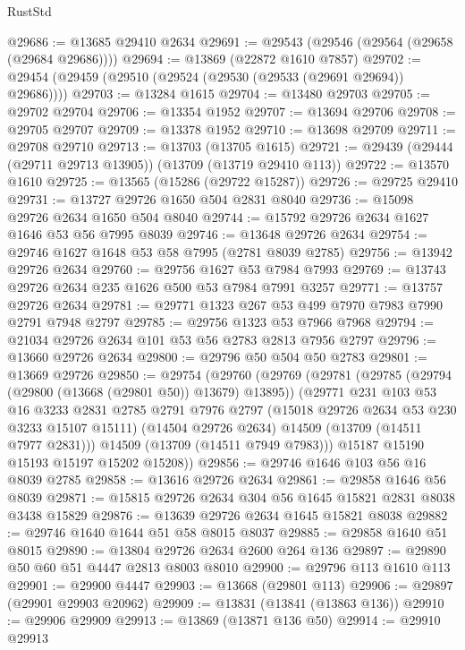 \begin{lexlean}{RustStd}
\begin{coremodule}
@29686 := @13685 @29410 @2634
@29691 := @29543 (@29546 (@29564 (@29658 (@29684 @29686))))
@29694 := @13869 (@22872 @1610 @7857)
@29702 := @29454 (@29459 (@29510 (@29524 (@29530 (@29533 (@29691 @29694)) @29686))))
@29703 := @13284 @1615
@29704 := @13480 @29703
@29705 := @29702 @29704
@29706 := @13354 @1952
@29707 := @13694 @29706
@29708 := @29705 @29707
@29709 := @13378 @1952
@29710 := @13698 @29709
@29711 := @29708 @29710
@29713 := @13703 (@13705 @1615)
@29721 := @29439 (@29444 (@29711 @29713 @13905)) (@13709 (@13719 @29410 @113))
@29722 := @13570 @1610
@29725 := @13565 (@15286 (@29722 @15287))
@29726 := @29725 @29410
@29731 := @13727 @29726 @1650 @504 @2831 @8040
@29736 := @15098 @29726 @2634 @1650 @504 @8040
@29744 := @15792 @29726 @2634 @1627 @1646 @53 @56 @7995 @8039
@29746 := @13648 @29726 @2634
@29754 := @29746 @1627 @1648 @53 @58 @7995 (@2781 @8039 @2785)
@29756 := @13942 @29726 @2634
@29760 := @29756 @1627 @53 @7984 @7993
@29769 := @13743 @29726 @2634 @235 @1626 @500 @53 @7984 @7991 @3257
@29771 := @13757 @29726 @2634
@29781 := @29771 @1323 @267 @53 @499 @7970 @7983 @7990 @2791 @7948 @2797
@29785 := @29756 @1323 @53 @7966 @7968
@29794 := @21034 @29726 @2634 @101 @53 @56 @2783 @2813 @7956 @2797
@29796 := @13660 @29726 @2634
@29800 := @29796 @50 @504 @50 @2783
@29801 := @13669 @29726
@29850 := @29754
    (@29760
      (@29769
        (@29781
          (@29785 (@29794 (@29800 (@13668 (@29801 @50)) @13679) @13895))
          (@29771
            @231
            @103
            @53
            @16
            @3233
            @2831
            @2785
            @2791
            @7976
            @2797
            (@15018 @29726 @2634 @53 @230 @3233 @15107 @15111)
            (@14504 @29726 @2634)
            @14509
            (@13709 (@14511 @7977 @2831)))
          @14509
          (@13709 (@14511 @7949 @7983)))
        @15187
        @15190
        @15193
        @15197
        @15202
        @15208))
@29856 := @29746 @1646 @103 @56 @16 @8039 @2785
@29858 := @13616 @29726 @2634
@29861 := @29858 @1646 @56 @8039
@29871 := @15815 @29726 @2634 @304 @56 @1645 @15821 @2831 @8038 @3438 @15829
@29876 := @13639 @29726 @2634 @1645 @15821 @8038
@29882 := @29746 @1640 @1644 @51 @58 @8015 @8037
@29885 := @29858 @1640 @51 @8015
@29890 := @13804 @29726 @2634 @2600 @264 @136
@29897 := @29890 @50 @60 @51 @4447 @2813 @8003 @8010
@29900 := @29796 @113 @1610 @113
@29901 := @29900 @4447
@29903 := @13668 (@29801 @113)
@29906 := @29897 (@29901 @29903 @20962)
@29909 := @13831 (@13841 (@13863 @136))
@29910 := @29906 @29909
@29913 := @13869 (@13871 @136 @50)
@29914 := @29910 @29913

\end{coremodule}
\end{lexlean}
